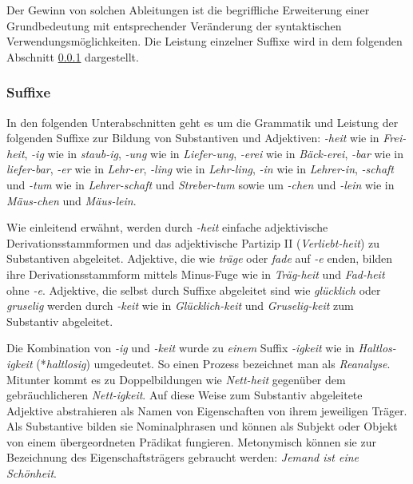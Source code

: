 Der Gewinn von solchen Ableitungen ist die begriffliche Erweiterung einer Grundbedeutung mit entsprechender Veränderung der syntaktischen Verwendungsmöglichkeiten. Die Leistung einzelner Suffixe wird in dem folgenden Abschnitt \ref{subsubsection:Suffixe} dargestellt. 


\subsubsection{Suffixe}\label{subsubsection:Suffixe}

In den folgenden Unterabschnitten geht es um die Grammatik und Leistung der folgenden Suffixe zur Bildung von Substantiven und Adjektiven: \textit{-heit} wie in \textit{Frei-heit}, \textit{-ig} wie in \textit{staub-ig}, \textit{-ung} wie in \textit{Liefer-ung}, \textit{-erei} wie in \textit{Bäck-erei}, \textit{-bar} wie in \textit{liefer-bar}, \textit{-er} wie in \textit{Lehr-er}, \textit{-ling} wie in \textit{Lehr-ling}, \textit{-in} wie in \textit{Lehrer-in}, \textit{-schaft} und \textit{-tum} wie in \textit{Lehrer-schaft} und \textit{Streber-tum} sowie um \textit{-chen} und \textit{-lein} wie in \textit{Mäus-chen} und \textit{Mäus-lein}.


\label{subsubsection:heit}

Wie einleitend erwähnt, werden durch \textit{-heit} einfache adjektivische Derivationsstammformen und das adjektivische Partizip II (\textit{Verliebt-heit}) zu Substantiven abgeleitet. Adjektive, die wie \textit{träge} oder \textit{fade} auf \textit{-e} enden, bilden ihre Derivationsstammform mittels Minus-Fuge wie in \textit{Träg-heit} und \textit{Fad-heit} ohne \textit{-e}. Adjektive, die selbst durch Suffixe abgeleitet sind wie \textit{glücklich} oder \textit{gruselig} werden durch \textit{-keit} wie in \textit{Glücklich-keit} und \textit{Gruselig-keit} zum Substantiv abgeleitet. 

Die Kombination von \textit{-ig} und \textit{-keit} wurde zu \textit{einem} Suffix \textit{-igkeit} wie in \textit{Haltlos-igkeit} (*\textit{haltlosig}) umgedeutet. So einen Prozess bezeichnet man als \textit{Reanalyse}. Mitunter kommt es zu Doppelbildungen wie \textit{Nett-heit} gegenüber dem gebräuchlicheren \textit{Nett-igkeit}. Auf diese Weise zum Substantiv abgeleitete Adjektive abstrahieren als Namen von Eigenschaften von ihrem jeweiligen Träger. Als Substantive bilden sie Nominalphrasen und können als Subjekt oder Objekt von einem übergeordneten Prädikat fungieren. Metonymisch können sie zur Bezeichnung des Eigenschaftsträgers gebraucht werden: \textit{Jemand ist eine Schönheit}.

